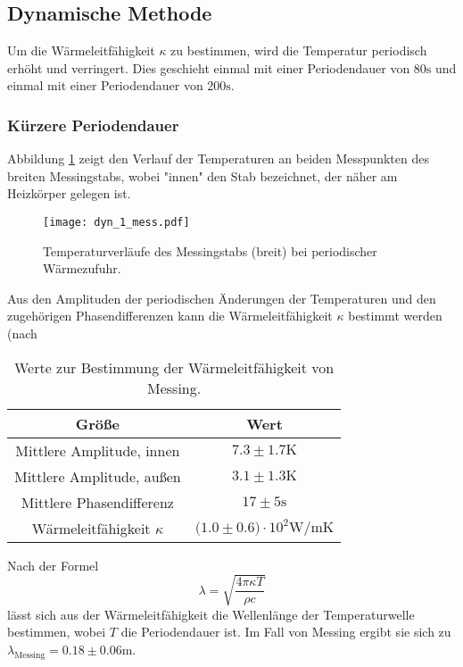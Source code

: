\subsection{Dynamische Methode}
  Um die Wärmeleitfähigkeit $\kappa$ zu bestimmen, wird die Temperatur periodisch erhöht und verringert. Dies geschieht einmal mit einer
  Periodendauer von $80 \si{\s}$ und einmal mit einer Periodendauer von $200 \si{\s}$.

  \subsubsection{Kürzere Periodendauer}
  Abbildung \ref{fig:messingdyn} zeigt den Verlauf der Temperaturen an beiden Messpunkten des breiten Messingstabs, wobei "innen" den Stab bezeichnet, der näher 
  am Heizkörper gelegen ist. 

  \begin{figure} %
    \centering
    \texttt{[image: dyn\_1\_mess.pdf]}
    \caption{Temperaturverläufe des Messingstabs (breit) bei periodischer Wärmezufuhr.}
    \label{fig:messingdyn}
  \end{figure}

  \FloatBarrier

  \noindent Aus den Amplituden der periodischen Änderungen der Temperaturen und den zugehörigen Phasendifferenzen kann die Wärmeleitfähigkeit $\kappa$ bestimmt werden (nach %

  \begin{table}
    \centering
    \caption{Werte zur Bestimmung der Wärmeleitfähigkeit von Messing.}
    \label{tab:kappamess}
    \begin{tabular}{c c }
      \toprule
      Größe & Wert \\
      \midrule %
      Mittlere Amplitude, innen & $7.3 \pm 1.7 \si{\kelvin}$\\
      Mittlere Amplitude, außen & $3.1 \pm 1.3 \si{\kelvin}$\\
      Mittlere Phasendifferenz & $17 \pm 5 \si{\s}$ \\
      Wärmeleitfähigkeit $\kappa$ & $\bigl(1.0 \pm 0.6\bigr) \cdot 10^{2} \si{\watt\per\m\kelvin}$ \\ %
      \bottomrule
    \end{tabular}
  \end{table}

  \FloatBarrier
  \noindent Nach der Formel
  \begin{equation*}
    \lambda = \sqrt{\frac{4 \pi \kappa T}{\rho c}}
  \end{equation*}
  lässt sich aus der Wärmeleitfähigkeit die Wellenlänge der Temperaturwelle bestimmen, wobei $T$ die Periodendauer ist. 
  Im Fall von Messing ergibt sie sich zu $\lambda_{\text{Messing}} = 0.18 \pm 0.06 \si{\m}$.\\
  \\
  

